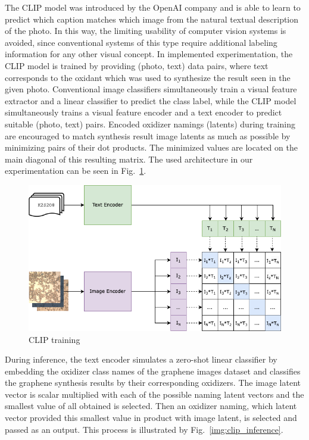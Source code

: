 \documentclass[runningheads]{llncs}
\begin{document}
The CLIP model \cite{CLIP} was introduced by the OpenAI company and is able to learn to predict which caption matches which image from the natural textual description of the photo. In this way, the limiting usability of computer vision systems is avoided, since conventional systems of this type require additional labeling information for any other visual concept. In implemented experimentation, the CLIP model is trained by providing (photo, text) data pairs, where text corresponds to the oxidant which was used to synthesize the result seen in the given photo. Conventional image classifiers simultaneously train a visual feature extractor and a linear classifier to predict the class label, while the CLIP model simultaneously trains a visual feature encoder and a text encoder to predict suitable (photo, text) pairs. Encoded oxidizer namings (latents) during training are encouraged to match synthesis result image latents as much as possible by minimizing pairs of their dot products. The minimized values are located on the main diagonal of this resulting matrix. The used architecture in our experimentation can be seen in Fig.~\ref{img:clip_traning}.
\par
\begin{figure}[h]
    \centering
    \includegraphics[scale=0.5]{img/CLIP_training.png}
    \caption{CLIP training} 
    \label{img:clip_traning}
\end{figure}
\par
During inference, the text encoder simulates a zero-shot linear classifier by embedding the oxidizer class names of the graphene images dataset and classifies the graphene synthesis results by their corresponding oxidizers. The image latent vector is scalar multiplied with each of the possible naming latent vectors and the smallest value of all obtained is selected. Then an oxidizer naming, which latent vector provided this smallest value in product with image latent, is selected and passed as an output. This process is illustrated by Fig.~\ref{img:clip_inference}.
\end{document}
